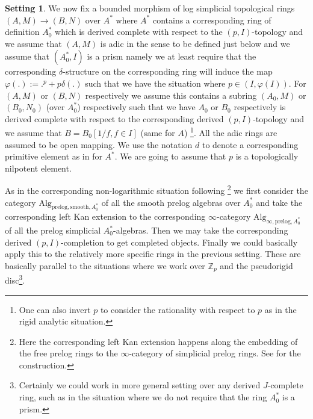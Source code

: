 \documentclass[11pt]{book}
\theoremstyle{definition}
\numberwithin{equation}{section}
\newtheorem{setting}[theorem]{Setting}
\begin{document}
\begin{setting}
We now fix a bounded morphism of log simplicial topological rings $(A,M)\rightarrow (B,N)$ over $A^*$ where $A^*$ contains a corresponding ring of definition $A^*_0$ which is derived complete with respect to the $(p,I)$-topology and we assume that $(A,M)$ is adic in the sense to be defined just below and we assume that $(A^*_0,I)$ is a prism namely we at least require that the corresponding $\delta$-structure on the corresponding ring will induce the map $\varphi(.):=.^p+p\delta(.)$ such that we have the situation where $p\in (I,\varphi(I))$. For $(A,M)$ or $(B,N)$ respectively we assume this contains a subring $(A_0,M)$ or $(B_0,N_0)$ (over $A^*_0$) respectively such that we have $A_0$ or $B_0$ respectively is derived complete with respect to the corresponding derived $(p,I)$-topology and we assume that $B=B_0[1/f,f\in I]$ (same for $A$) \footnote{One can also invert $p$ to consider the rationality with respect to $p$ as in the rigid analytic situation.}. All the adic rings are assumed to be open mapping. We use the notation $d$ to denote a corresponding primitive element as in \cite[Section 2.3]{12BS} for $A^*$. We are going to assume that $p$ is a topologically nilpotent element.
\end{setting}



\indent As in the corresponding non-logarithmic situation following \cite[Chapter 6]{12B1}\footnote{Here the corresponding left Kan extension happens along the embedding of the free prelog rings to the $\infty$-category of simplicial prelog rings. See \cite[Chapter 6]{12B1} for the construction.} we first consider the category $\mathrm{Alg}_{\mathrm{prelog},\mathrm{smooth},A_0^*}$ of all the smooth prelog algebras over $A_0^*$ and take the corresponding left Kan extension to the corresponding $\infty$-category $\mathrm{Alg}_{\infty,\mathrm{prelog},A_0^*}$ of all the prelog simplicial $A_0^*$-algebras. Then we may take the corresponding derived $(p,I)$-completion to get completed objects. Finally we could basically apply this to the relatively more specific rings in the previous setting. These are basically parallel to the situations where we work over $\mathbb{Z}_p$ and the pseudorigid disc\footnote{Certainly we could work in more general setting over any derived $J$-complete ring, such as in the situation where we do not require that the ring $A^*_0$ is a prism.}. 


\end{document}
